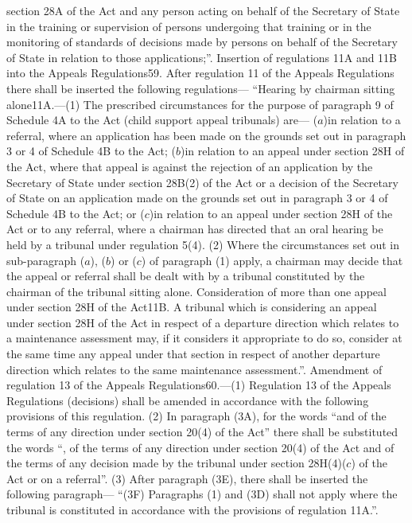 \documentclass[a4paper]{article}
\begin{document}
section 28A of the Act and any person acting on behalf of the Secretary of State
in the training or supervision of persons undergoing that training or in the
monitoring of standards of decisions made by persons on behalf of the Secretary
of State in relation to those applications;”.
Insertion of regulations 11A and 11B into the Appeals Regulations59. After
regulation 11 of the Appeals Regulations there shall be inserted the following
regulations—
“Hearing by chairman sitting alone11A.—(1) The prescribed circumstances for the
purpose of paragraph 9 of Schedule 4A to the Act (child support appeal
tribunals) are—
($a$)in relation to a referral, where an application has been made on the grounds
set out in paragraph 3 or 4 of Schedule 4B to the Act;
($b$)in relation to an appeal under section 28H of the Act, where that appeal is
against the rejection of an application by the Secretary of State under section
28B(2) of the Act or a decision of the Secretary of State on an application made
on the grounds set out in paragraph 3 or 4 of Schedule 4B to the Act; or
($c$)in relation to an appeal under section 28H of the Act or to any referral,
where a chairman has directed that an oral hearing be held by a tribunal under
regulation 5(4).
(2) Where the circumstances set out in sub-paragraph ($a$), ($b$) or ($c$) of
paragraph (1) apply, a chairman may decide that the appeal or referral shall be
dealt with by a tribunal constituted by the chairman of the tribunal sitting
alone.
Consideration of more than one appeal under section 28H of the Act11B. A
tribunal which is considering an appeal under section 28H of the Act in respect
of a departure direction which relates to a maintenance assessment may, if it
considers it appropriate to do so, consider at the same time any appeal under
that section in respect of another departure direction which relates to the same
maintenance assessment.”.
Amendment of regulation 13 of the Appeals Regulations60.—(1) Regulation 13 of
the Appeals Regulations (decisions) shall be amended in accordance with the
following provisions of this regulation.
(2) In paragraph (3A), for the words “and of the terms of any direction under
section 20(4) of the Act” there shall be substituted the words “, of the terms
of any direction under section 20(4) of the Act and of the terms of any decision
made by the tribunal under section 28H(4)($c$) of the Act or on a referral”.
(3) After paragraph (3E), there shall be inserted the following paragraph—
“(3F) Paragraphs (1) and (3D) shall not apply where the tribunal is constituted
in accordance with the provisions of regulation 11A.”.
\end{document}
